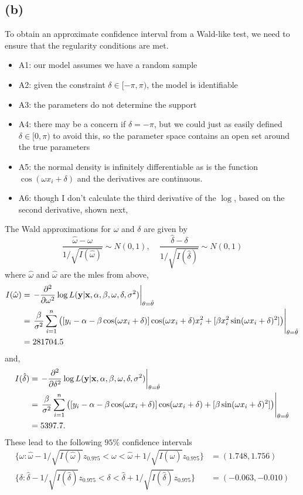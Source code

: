 \documentclass[12pt]{article}
\begin{document}
\subsection*{(b)}

\noindent To obtain an approximate confidence interval from a Wald-like test, we need to ensure that the regularity conditions are met.
\begin{itemize}
\item A1: our model assumes we have a random sample
\item A2: given the constraint $\delta\in[-\pi,\pi)$, the model is identifiable
\item A3: the parameters do not determine the support
\item A4: there may be a concern if $\delta=-\pi$, but we could just as easily defined $\delta\in[0,\pi)$ to avoid this, so the parameter space contains an open set around the true parameters
\item A5: the normal density is infinitely differentiable as is the function $\cos(\omega x_i+\delta)$ and the derivatives are continuous.
\item A6: though I don't calculate the third derivative of the $\log$, based on the second derivative, shown next,
\end{itemize}
\noindent The Wald approximations for $\omega$ and $\delta$ are given by
\[ \frac{\hat\omega - \omega}{1/\sqrt{I(\hat\omega)}} \sim N(0,1), ~~~~~
    \frac{\hat\delta - \delta}{1/\sqrt{I(\hat\delta)}} \sim N(0,1) \]
\noindent where $\hat\omega$ and $\hat\omega$ are the mles from above,
\begin{align*}
I(\hat\omega) &= \left.-\frac{\partial^2}{\partial\omega^2}\log L(\mathbf{\bm{y}}|\mathbf{\bm{x}},\alpha,\beta,\omega,\delta,\sigma^2)\right\vert_{\theta=\hat\theta} \\
&= \left.\frac{\beta}{\sigma^2}\sum_{i=1}^n\left([y_i-\alpha-\beta\cos(\omega x_i+\delta)]\cos(\omega x_i+\delta)x_i^2 + [\beta x_i^2\sin(\omega x_i+\delta)^2]\right)\right\vert_{\theta=\hat\theta} \\
&= 281704.5
\end{align*}
\noindent and,
\begin{align*}
I(\hat\delta) &= \left.-\frac{\partial^2}{\partial\delta^2}\log L(\mathbf{\bm{y}}|\mathbf{\bm{x}},\alpha,\beta,\omega,\delta,\sigma^2)\right\vert_{\theta=\hat\theta} \\
&= \left.\frac{\beta}{\sigma^2}\sum_{i=1}^n\left([y_i-\alpha-\beta\cos(\omega x_i+\delta)]\cos(\omega x_i+\delta) + [\beta\sin(\omega x_i+\delta)^2]\right)\right\vert_{\theta=\hat\theta} \\
&= 5397.7.
\end{align*}
\noindent These lead to the following $95\%$ confidence intervals
\begin{align*}
\{\omega : \hat\omega - 1/\sqrt{I(\hat\omega)} z_{0.975} < \omega < \hat\omega + 1/\sqrt{I(\hat\omega)} z_{0.975} \} &= (1.748, 1.756) \\
\{\delta : \hat\delta - 1/\sqrt{I(\hat\delta)} z_{0.975} < \delta < \hat\delta + 1/\sqrt{I(\hat\delta)} z_{0.975} \} &= (-0.063, -0.010)
\end{align*}
\end{document}
